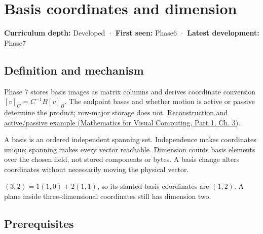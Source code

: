 \hypertarget{appendix-ce0341f7ea0d}{}\label{referencestart:appendix-ce0341f7ea0d}
\section{Basis coordinates and dimension}\label{appendix-ce0341f7ea0d-basis-coordinates-and-dimension}

\hypertarget{appendix-ce0341f7ea0d-basis-coordinates-and-dimension}{}

\textbf{Curriculum depth:} Developed · \textbf{First seen:} Phase6 · \textbf{Latest development:} Phase7

\begin{allmightroledefinition}

\subsection{Definition and mechanism}\label{appendix-ce0341f7ea0d-definition-and-mechanism}

\hypertarget{appendix-ce0341f7ea0d-definition-and-mechanism}{}

Phase 7 stores basis images as matrix columns and derives coordinate conversion \([v]_C=C^{-1}B[v]_B\). The endpoint bases and whether motion is active or passive determine the product; row-major storage does not. \href{../02-Mathematics-for-Visual-Computing-P01/main.pdf\#01-foundations-i-ch019-coordinates-can-change-while-the-geometric-object-stays-still}{Reconstruction and active/passive example (Mathematics for Visual Computing, Part 1, Ch. 3)}.

\end{allmightroledefinition}

A basis is an ordered independent spanning set. Independence makes coordinates unique; spanning makes every vector reachable. Dimension counts basis elements over the chosen field, not stored components or bytes. A basis change alters coordinates without necessarily moving the physical vector.

\((3,2)=1(1,0)+2(1,1)\), so its slanted-basis coordinates are \((1,2)\). A plane inside three-dimensional coordinates still has dimension two.

\subsection{Prerequisites}\label{appendix-ce0341f7ea0d-prerequisites}

\hypertarget{appendix-ce0341f7ea0d-prerequisites}{}

